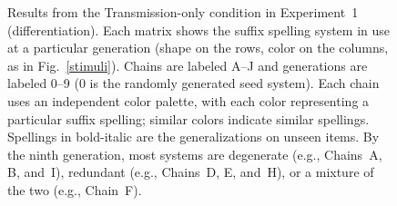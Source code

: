 \documentclass[doc,biblatex]{apa7}
\begin{document}
	\begin{figure}
	\vspace*{2pt}
	\caption{Results from the Transmission-only condition in Experiment~1 (differentiation). Each matrix shows the suffix spelling system in use at a particular generation (shape on the rows, color on the columns, as in Fig.~\ref{stimuli}). Chains are labeled A--J and generations are labeled 0–9 (0 is the randomly generated seed system). Each chain uses an independent color palette, with each color representing a particular suffix spelling; similar colors indicate similar spellings. Spellings in bold-italic are the generalizations on unseen items. By the ninth generation, most systems are degenerate (e.g., Chains~A, B, and~I), redundant (e.g., Chains~D, E, and~H), or a mixture of the two (e.g., Chain~F).}
	\label{dif_lrn}
	\end{figure}
\end{document}
